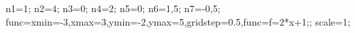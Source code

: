 \documentclass[exercice]{thedocument}%
\begin{document}
%
    \>n1=1;%
    \>n2=4;%
    \>n3=0;%
    \>n4=2;%
    \>n5=0;%
    \>n6=1,5;%
    \>n7=-0,5;%
    \>func={xmin=-3,xmax=3,ymin=-2,ymax=5,gridstep=0.5,func=f=2*x+1;};%
    \>scale=1;%
\end{document}
